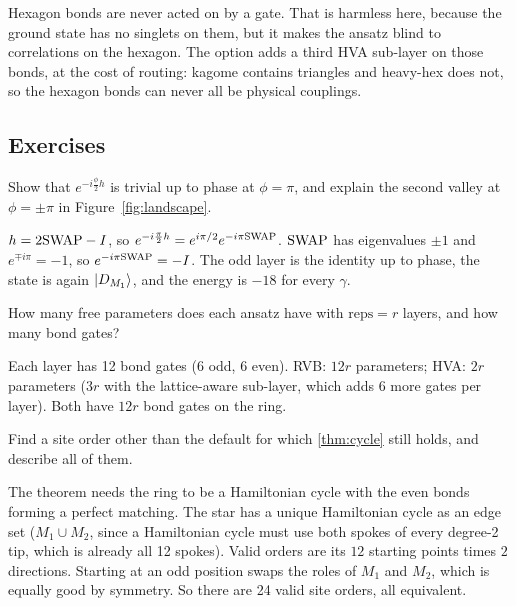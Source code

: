 \begin{rem}
  Hexagon bonds are never acted on by a gate. That is harmless here, because the ground state
  has no singlets on them, but it makes the ansatz blind to correlations on the hexagon. The
  option  adds a third HVA sub-layer on those bonds, at the cost of
  routing: kagome contains triangles and heavy-hex does not, so the hexagon bonds can never all be
  physical couplings.
\end{rem}

\subsection*{Exercises}

\begin{exer}
  Show that $e^{-i\frac\phi2 h}$ is trivial up to phase at $\phi=\pi$, and explain the second
  valley at $\phi=\pm\pi$ in Figure~\ref{fig:landscape}.
\end{exer}
\begin{sol}
  $h=2\mathrm{SWAP}-I$, so $e^{-i\frac\pi2h}=e^{i\pi/2}e^{-i\pi\mathrm{SWAP}}$. $\mathrm{SWAP}$ has eigenvalues $\pm1$
  and $e^{\mp i\pi}=-1$, so $e^{-i\pi\mathrm{SWAP}}=-I$. The odd layer is the identity up to phase,
  the state is again $\ket{D_{M_1}}$, and the energy is $-18$ for every $\gamma$.
\end{sol}

\begin{exer}
  How many free parameters does each ansatz have with $\mathrm{reps}=r$ layers, and how many
  bond gates?
\end{exer}
\begin{sol}
  Each layer has 12 bond gates (6 odd, 6 even). RVB: $12r$ parameters; HVA: $2r$ parameters
  ($3r$ with the lattice-aware sub-layer, which adds 6 more gates per layer). Both have $12r$ bond
  gates on the ring.
\end{sol}

\begin{prob}
  Find a site order other than the default for which \cref{thm:cycle} still holds, and
  describe all of them.
\end{prob}
\begin{sol}
  The theorem needs the ring to be a Hamiltonian cycle with the even bonds forming a perfect
  matching. The star has a unique Hamiltonian cycle as an edge set ($M_1\cup M_2$, since a
  Hamiltonian cycle must use both spokes of every degree-2 tip, which is already all 12 spokes).
  Valid orders are its $12$ starting points times $2$ directions. Starting at an odd
  position swaps the roles of $M_1$ and $M_2$, which is equally good by symmetry. So there are 24
  valid site orders, all equivalent.
\end{sol}
